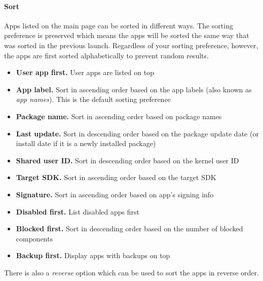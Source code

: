 \paragraph{Sort}\hypertarget{par:main-page-sort}{}
Apps listed on the main page can be sorted in different ways. The sorting preference is preserved which means the apps
will be sorted the same way that was sorted in the previous launch. Regardless of your sorting preference, however, the
apps are first sorted alphabetically to prevent random results.
\begin{itemize}
    \item \textbf{User app first.} User apps are listed on top
    \item \textbf{App label.} Sort in ascending order based on the app labels (also known as \textit{app names}). This
    is the default sorting preference
    \item \textbf{Package name.} Sort in ascending order based on package names
    \item \textbf{Last update.} Sort in descending order based on the package update date (or install date if it is a
    newly installed package)
    \item \textbf{Shared user ID.} Sort in descending order based on the kernel user ID
    \item \textbf{Target SDK.} Sort in ascending order based on the target SDK
    \item \textbf{Signature.} Sort in ascending order based on app's signing info
    \item \textbf{Disabled first.} List disabled apps first
    \item \textbf{Blocked first.} Sort in descending order based on the number of blocked components
    \item \textbf{Backup first.} Display apps with backups on top
\end{itemize}

There is also a \textit{reverse} option which can be used to sort the apps in reverse order.

